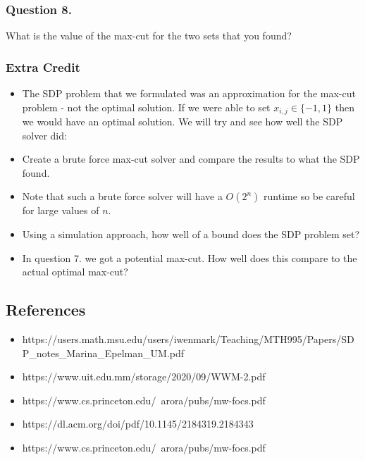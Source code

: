 \documentclass{article}
\begin{document}
\subsubsection{Question 8.}
What is the value of the max-cut for the two sets that you found?


\subsubsection{Extra Credit}
\begin{itemize}
\item\label{item:1} The SDP problem that we formulated was an approximation for the max-cut problem - not the optimal solution. If we were able to set \( x_{i, j} \in \{ -1, 1 \} \) then we would have an optimal solution. We will try and see how well the SDP solver did:
\item\label{item:2}
Create a brute force max-cut solver and compare the results to what the SDP found.
\item\label{item:3}
Note that such a brute force solver will have a \( O(2^n) \) runtime so be careful for large values of \( n \).
\item\label{item:4}
Using a simulation approach, how well of a bound does the SDP problem set?
\item\label{item:5}
In question 7. we got a potential max-cut. How well does this compare to the actual optimal max-cut?
\end{itemize}



\newpage
\subsection{References}
\begin{itemize}
\item
https://users.math.msu.edu/users/iwenmark/Teaching/MTH995/Papers/SDP\_notes\_Marina\_Epelman\_UM.pdf
\item https://www.uit.edu.mm/storage/2020/09/WWM-2.pdf
\item https://www.cs.princeton.edu/~arora/pubs/mw-focs.pdf
\item https://dl.acm.org/doi/pdf/10.1145/2184319.2184343
\item https://www.cs.princeton.edu/~arora/pubs/mw-focs.pdf
\end{itemize}
\end{document}
